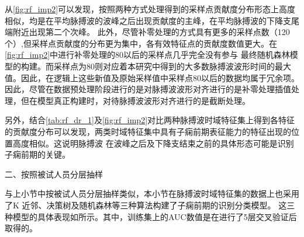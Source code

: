 从\autoref{fig:rf_imp2}可以发现，按照两种方式处理得到的采样点贡献度分布形态上高度相似，均是在平均脉搏波的波峰之后出现贡献度的主峰，在平均脉搏波的下降支尾端附近出现第二个次峰。
此外，尽管补零处理的方式具有更多的采样点数（120个）,但采样点贡献度的分布更为集中，各有效特征点的贡献度数值更大。在\autoref{fig:rf_imp2}中进行补零处理的80以后的采样点几乎完全没有参与
最终随机森林模型的构建。而采样点为80则对应着本研究中得到的大多数脉搏波波形时间的最大值。因此，在逻辑上这些新值及原始采样值中采样点80以后的数据均属于冗余项。
因此，尽管在数据预处理阶段进行的是对脉搏波波形对齐进行的是补零处理插值处理，但在模型真正构建时，对待脉搏波波形对齐进行的是截断处理。

另外，结合\autoref{tab:rf_dr_1}及\autoref{fig:rf_imp2}对比两种脉搏波时域特征集上得到各特征的贡献度分布可以发现，两类时域特征集中具有子痫前期表征能力的特征出现的位置高度相似。这说明脉搏波
在波峰之后及下降支结束之前的具体形态可能是识别子痫前期的关键。

二、按照被试人员分层抽样

与上小节中按被试人员分层抽样类似，本小节在脉搏波时域特征集的数据上也采用了K 近邻、决策树及随机森林等三种算法构建了子痫前期的识别分类模型。
这三种模型的具体表现如所示。其中，训练集上的AUC数值是在进行了5层交叉验证后取得的。

